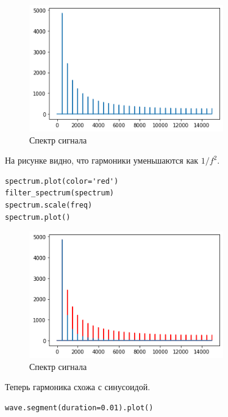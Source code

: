 \documentclass[a4paper,12pt]{report}
\begin{document}
\begin{figure}[H]
        \centering
        \includegraphics[width=0.75\textwidth]{lab2_fig6_1.png}
        \caption{Спектр сигнала}
        \label{fig:lab2_fig6_1}
\end{figure}

На рисунке видно, что гармоники уменьшаются как \(1 / f^2\).

\begin{lstlisting}[caption=Сравнение гармоник]
spectrum.plot(color='red')
filter_spectrum(spectrum)
spectrum.scale(freq)
spectrum.plot()
\end{lstlisting}

\begin{figure}[H]
        \centering
        \includegraphics[width=0.75\textwidth]{lab2_fig6_2.png}
        \caption{Спектр сигнала}
        \label{fig:lab2_fig6_2}
\end{figure}

Теперь гармоника схожа с синусоидой.

\begin{lstlisting}[caption=Сегмент звука]
wave.segment(duration=0.01).plot()
\end{lstlisting}
\end{document}
